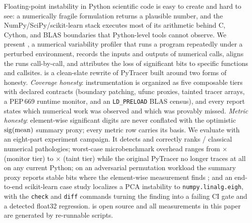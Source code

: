 Floating-point instability in Python scientific code is easy to create and
hard to see: a numerically fragile formulation returns a plausible number,
and the NumPy/SciPy/scikit-learn stack executes most of its arithmetic
behind C, Cython, and BLAS boundaries that Python-level tools cannot
observe. We present \pyt{}, a numerical variability profiler that runs a
program repeatedly under a perturbed environment, records the inputs and
outputs of numerical calls, aligns the runs call-by-call, and attributes
the loss of significant bits to specific functions and callsites. \pyt{}
is a clean-slate rewrite of PyTracer built around two forms of honesty.
\emph{Coverage honesty}: instrumentation is organized as five composable
tiers with declared contracts (boundary patching, ufunc proxies, tainted
tracer arrays, a PEP\,669 runtime monitor, and an \texttt{LD\_PRELOAD}
BLAS census), and every report states which numerical work was observed
and which was provably missed. \emph{Metric honesty}: element-wise
significant digits are never conflated with the optimistic
$\operatorname{sig}(\mathrm{mean})$ summary proxy; every metric row carries its basis.
We evaluate \pyt{} with an eight-part experiment campaign. It detects and
correctly ranks \nDetected{}/\nPathologies{} classical numerical
pathologies; worst-case microbenchmark overhead ranges from
\ovMonitor$\times$ (monitor tier) to \ovTaint$\times$ (taint tier) while
the original PyTracer no longer traces at all on any current Python; on an
adversarial permutation workload the summary proxy reports
\permSummaryBits{} stable bits where the element-wise measurement finds
\permElementBits{}; and an end-to-end scikit-learn case study localizes a
PCA instability to \texttt{numpy.linalg.eigh}, with the \texttt{check} and
\texttt{diff} commands turning the finding into a failing CI gate and a
detected float32 regression. \pyt{} is open source and all measurements in
this paper are generated by re-runnable scripts.
